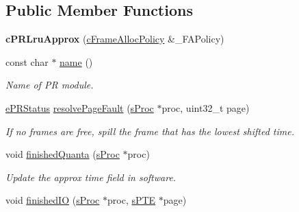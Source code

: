 \subsection*{\-Public \-Member \-Functions}
\begin{DoxyCompactItemize}
\item 
\hypertarget{classcPRLruApprox_afd0d2b59608725365a49418ac479ad00}{{\bfseries c\-P\-R\-Lru\-Approx} (\hyperlink{classcFrameAllocPolicy}{c\-Frame\-Alloc\-Policy} \&\-\_\-\-F\-A\-Policy)}\label{d1/d58/classcPRLruApprox_afd0d2b59608725365a49418ac479ad00}

\item 
const char $\ast$ \hyperlink{classcPRLruApprox_acf51ca9d36ab017456f856809e13dab7}{name} ()
\begin{DoxyCompactList}\small\item\em \-Name of \-P\-R module. \end{DoxyCompactList}\item 
\hyperlink{pageReplace_8h_af4bc4c41a44c2bd80e8cbf1aae370217}{e\-P\-R\-Status} \hyperlink{classcPRLruApprox_adc2d729279fec03798c9027c87af7c84}{resolve\-Page\-Fault} (\hyperlink{structsProc}{s\-Proc} $\ast$proc, uint32\-\_\-t page)
\begin{DoxyCompactList}\small\item\em \-If no frames are free, spill the frame that has the lowest shifted time. \end{DoxyCompactList}\item 
\hypertarget{classcPRLruApprox_aaf6600b3edb01fbbb0257f622b3fb1ec}{void \hyperlink{classcPRLruApprox_aaf6600b3edb01fbbb0257f622b3fb1ec}{finished\-Quanta} (\hyperlink{structsProc}{s\-Proc} $\ast$proc)}\label{d1/d58/classcPRLruApprox_aaf6600b3edb01fbbb0257f622b3fb1ec}

\begin{DoxyCompactList}\small\item\em \-Update the approx time field in software. \end{DoxyCompactList}\item 
\hypertarget{classcPRLruApprox_a93c48941ed2511000566bb3d24cf8313}{void \hyperlink{classcPRLruApprox_a93c48941ed2511000566bb3d24cf8313}{finished\-I\-O} (\hyperlink{structsProc}{s\-Proc} $\ast$proc, \hyperlink{structsPTE}{s\-P\-T\-E} $\ast$page)}\label{d1/d58/classcPRLruApprox_a93c48941ed2511000566bb3d24cf8313}


\end{DoxyCompactItemize}
